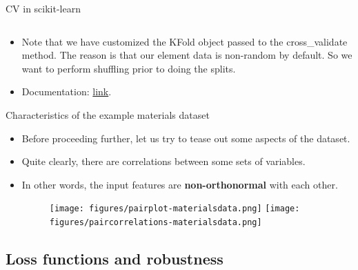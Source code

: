 \documentclass[aspectratio=169]{beamer}
\begin{document}
\begin{frame}[fragile]{CV in scikit-learn}
\inputminted{python}{example_sklearn_cv.py}
\begin{itemize}
    \item Note that we have customized the KFold object passed to the cross\_validate method. The reason is that our element data is non-random by default. So we want to perform shuffling prior to doing the splits.
    \item Documentation: \href{https://scikit-learn.org/stable/modules/generated/sklearn.model_selection.cross_validate.html?highlight=cross_validate#sklearn.model_selection.cross_validate}{link}.
\end{itemize}
\end{frame}


\begin{frame}{Characteristics of the example materials dataset}
    \begin{itemize}
        \item Before proceeding further, let us try to tease out some aspects of the dataset.
        \item Quite clearly, there are correlations between some sets of variables.
        \item In other words, the input features are \textbf{non-orthonormal} with each other.
        \begin{figure}
            \centering
            \texttt{[image: figures/pairplot-materialsdata.png]}
            \texttt{[image: figures/paircorrelations-materialsdata.png]}
        \end{figure}
    \end{itemize}
\end{frame}


\subsection{Loss functions and robustness}
\end{document}

